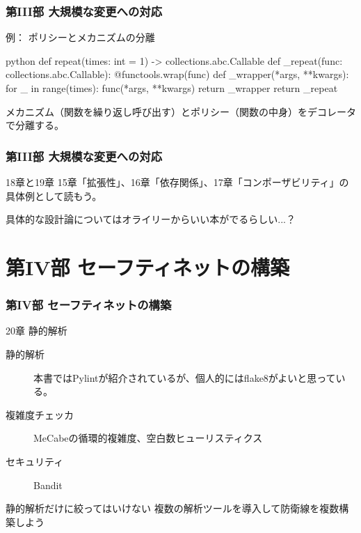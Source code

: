 \documentclass[aspectratio=169,dvipdfmx,12pt,notheorems]{beamer}
\theoremstyle{definition}
\begin{document}
\begin{frame}[fragile]\frametitle{第III部 大規模な変更への対応}

\begin{exampleblock}{例： ポリシーとメカニズムの分離}
\begin{pygments}{python}
def repeat(times: int = 1) -> collections.abc.Callable
    def _repeat(func: collections.abc.Callable):
        @functools.wrap(func)
        def _wrapper(*args, **kwargs):
            for _ in range(times):
                func(*args, **kwargs)
        return _wrapper
    return _repeat
\end{pygments}
\end{exampleblock}
メカニズム（関数を繰り返し呼び出す）とポリシー（関数の中身）をデコレータで分離する。
\end{frame}

\begin{frame}\frametitle{第III部 大規模な変更への対応}

\begin{block}{18章と19章}
15章「拡張性」、16章「依存関係」、17章「コンポーザビリティ」の具体例として読もう。
\end{block}
具体的な設計論についてはオライリーからいい本がでるらしい...？
\end{frame}

\section{第IV部 セーフティネットの構築}

\begin{frame}\frametitle{第IV部 セーフティネットの構築}

\begin{block}{20章 静的解析}
\begin{description}
\item[静的解析] 本書ではPylintが紹介されているが、個人的にはflake8がよいと思っている。
\item[複雑度チェッカ] MeCabeの循環的複雑度、空白数ヒューリスティクス
\item[セキュリティ] Bandit
\end{description}

\end{block}

\begin{alertblock}{静的解析だけに絞ってはいけない}
複数の解析ツールを導入して防衛線を複数構築しよう
\end{alertblock}

\end{frame}
\end{document}

